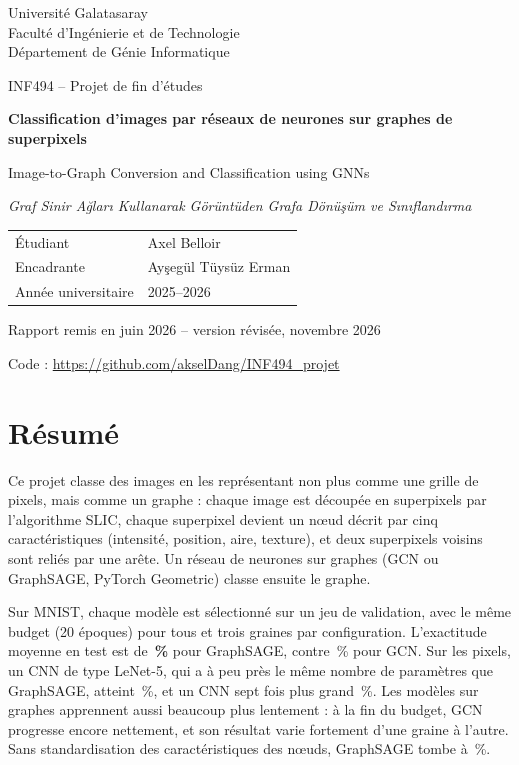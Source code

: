 \documentclass[11pt,a4paper]{article}
\newcommand{\pct}{\,\%}
\begin{document}
\begin{titlepage}
\centering
{\large Université Galatasaray\\Faculté d'Ingénierie et de Technologie\\Département de Génie Informatique\par}
\vspace{1.6cm}
{\large INF494 -- Projet de fin d'études\par}
\vspace{1.2cm}
{\LARGE\bfseries Classification d'images par réseaux de neurones sur graphes de superpixels\par}
\vspace{0.6cm}
{\large Image-to-Graph Conversion and Classification using GNNs\par}
\vspace{0.2cm}
{\normalsize\itshape Graf Sinir Ağları Kullanarak Görüntüden Grafa Dönüşüm ve Sınıflandırma\par}
\vspace{2cm}
\begin{tabular}{ll}
Étudiant & Axel Belloir \\
Encadrante & Ayşegül Tüysüz Erman \\
Année universitaire & 2025--2026 \\
\end{tabular}
\vfill
{\large Rapport remis en juin 2026 -- version révisée, novembre 2026\par}
\vspace{0.4cm}
{\small Code : \url{https://github.com/akselDang/INF494_projet}\par}
\end{titlepage}

\section*{Résumé}
Ce projet classe des images en les représentant non plus comme une grille de pixels, mais comme un graphe :
chaque image est découpée en superpixels par l'algorithme SLIC, chaque superpixel devient un nœud décrit par
cinq caractéristiques (intensité, position, aire, texture), et deux superpixels voisins sont reliés par une arête.
Un réseau de neurones sur graphes (GCN ou GraphSAGE, PyTorch Geometric) classe ensuite le graphe.

Sur MNIST, chaque modèle est sélectionné sur un jeu de validation, avec le même budget (20 époques) pour
tous et trois graines par configuration. L'exactitude moyenne en test est de \textbf{\testsage\pct} pour
GraphSAGE, contre \testgcn\pct{} pour GCN. Sur les pixels, un CNN de type LeNet-5, qui a à peu près le même nombre de paramètres
que GraphSAGE, atteint \testlenet\pct, et un CNN sept fois plus grand \testcnn\pct. Les modèles sur graphes
apprennent aussi beaucoup plus lentement : à la fin du budget, GCN progresse encore nettement, et son résultat varie
fortement d'une graine à l'autre. Sans standardisation des caractéristiques des nœuds, GraphSAGE tombe à
\testsageraw\pct.
\end{document}

